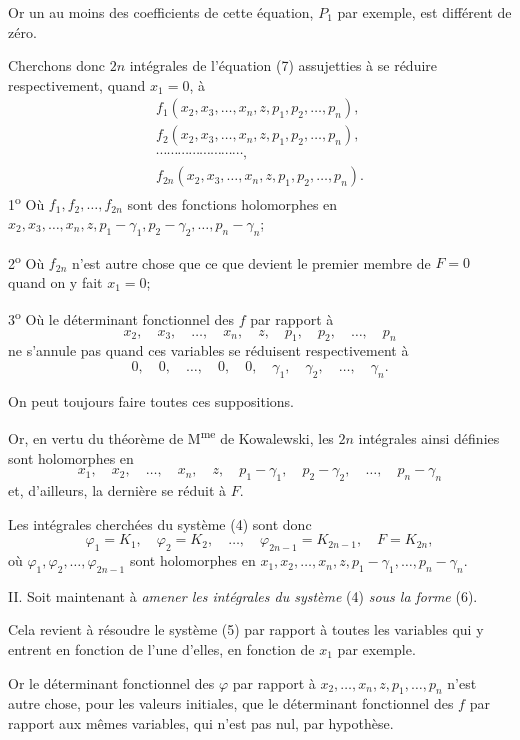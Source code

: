 \documentclass[11pt]{article}
\begin{document}
Or un au moins des coefficients de cette équation, $P_1$ par exemple, est différent de zéro.

Cherchons donc $2n$ intégrales de l’équation (7) assujetties à se réduire respectivement, quand $x_1=0$, à
\[
\begin{gathered}
f_1(x_2,x_3,\ldots,x_n,z,p_1,p_2,\ldots,p_n),\\
f_2(x_2,x_3,\ldots,x_n,z,p_1,p_2,\ldots,p_n),\\
\cdots\cdots\cdots\cdots\cdots\cdots\cdots\cdots,\\
f_{2n}(x_2,x_3,\ldots,x_n,z,p_1,p_2,\ldots,p_n).
\end{gathered}
\]
1\textsuperscript{o} Où $f_1,f_2,\ldots,f_{2n}$ sont des fonctions holomorphes en $x_2,x_3,\ldots,x_n,z,p_1-\gamma_1,p_2-\gamma_2,\ldots,p_n-\gamma_n$;

2\textsuperscript{o} Où $f_{2n}$ n’est autre chose que ce que devient le premier membre de $F=0$ quand on y fait $x_1=0$;

3\textsuperscript{o} Où le déterminant fonctionnel des $f$ par rapport à
\[
x_2,\quad x_3,\quad \ldots,\quad x_n,\quad z,\quad p_1,\quad p_2,\quad \ldots,\quad p_n
\]
ne s’annule pas quand ces variables se réduisent respectivement à
\[
0,\quad 0,\quad \ldots,\quad 0,\quad 0,\quad \gamma_1,\quad \gamma_2,\quad \ldots,\quad \gamma_n.
\]

On peut toujours faire toutes ces suppositions.

Or, en vertu du théorème de M\textsuperscript{me} de Kowalewski, les $2n$ intégrales ainsi définies sont holomorphes en
\[
x_1,\quad x_2,\quad \ldots,\quad x_n,\quad z,\quad p_1-\gamma_1,\quad p_2-\gamma_2,\quad \ldots,\quad p_n-\gamma_n
\]
et, d’ailleurs, la dernière se réduit à $F$.

Les intégrales cherchées du système (4) sont donc
\[
\varphi_1=K_1,\quad \varphi_2=K_2,\quad \ldots,\quad \varphi_{2n-1}=K_{2n-1},\quad F=K_{2n},
\]
où $\varphi_1,\varphi_2,\ldots,\varphi_{2n-1}$ sont holomorphes en $x_1,x_2,\ldots,x_n,z,p_1-\gamma_1,\ldots,p_n-\gamma_n$.

II. Soit maintenant à \emph{amener les intégrales du système} (4) \emph{sous la forme} (6).

Cela revient à résoudre le système (5) par rapport à toutes les variables qui y entrent en fonction de l’une d’elles, en fonction de $x_1$ par exemple.

Or le déterminant fonctionnel des $\varphi$ par rapport à $x_2,\ldots,x_n,z,p_1,\ldots,p_n$ n’est autre chose, pour les valeurs initiales, que le déterminant fonctionnel des $f$ par rapport aux mêmes variables, qui n’est pas nul, par hypothèse.
\end{document}
